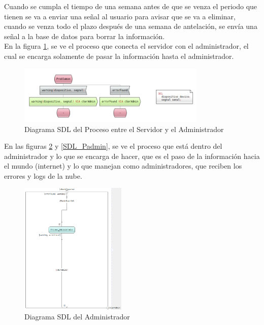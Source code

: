 Cuando se cumpla el tiempo de una semana antes de que se venza el periodo que tienen se va a enviar una señal al usuario para avisar que se va a eliminar, cuando se venza todo el plazo después de una semana de antelación, se envía una señal a la base de datos para borrar la información. \\

En la figura \ref{SDL_PserAdmin}, se ve el proceso que conecta el servidor con el administrador, el cual se encarga solamente de pasar la información hasta el administrador.

\begin{figure}[h]
    \centering
    \includegraphics[width=0.8\textwidth]{images/SDL_ProcesoSerAdmi.png}
    \caption{Diagrama SDL del Proceso entre el Servidor y el Administrador}
    \label{SDL_PserAdmin}
\end{figure}

En las figuras \ref{SDL_Admin} y \ref{SDL_Padmin}, se ve el proceso que está dentro del administrador y lo que se encarga de hacer, que es el paso de la información hacia el mundo (internet) y lo que manejan como administradores, que reciben los errores y logs de la nube.

\begin{figure}[h]
    \centering
    \includegraphics[width=0.45\textwidth]{images/SDL_Administrador.png}
    \caption{Diagrama SDL del Administrador}
    \label{SDL_Admin}
\end{figure}

